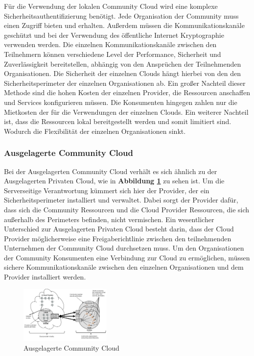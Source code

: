 Für die Verwendung der lokalen Community Cloud wird eine komplexe Sicherheitsauthentifizierung benötigt. Jede Organisation der Community muss einen Zugriff bieten und erhalten.
Außerdem müssen die Kommunikationskanäle geschützt und bei der Verwendung des öffentliche Internet Kryptographie verwenden werden. Die einzelnen Kommunikationskanäle zwischen den Teilnehmern 
können verschiedene Level der Performance, Sicherheit und Zuverlässigkeit bereitstellen, abhängig von den Ansprüchen der Teilnehmenden Organisationen. Die Sicherheit der einzelnen Clouds hängt 
hierbei von den den Sicherheitsperimeter der einzelnen Organisationen ab. Ein großer Nachteil dieser Methode sind die hohen Kosten der einzelnen Provider, die Ressourcen 
anschaffen und Services konfigurieren müssen. Die Konsumenten hingegen zahlen nur die Mietkosten der für die Verwendungen der einzelnen Clouds. Ein weiterer Nachteil ist, dass 
die Ressourcen lokal bereitgestellt werden und somit limitiert sind. Wodurch die Flexibilität der einzelnen Organisationen sinkt.


\subsubsection{Ausgelagerte Community Cloud}

Bei der Ausgelagerten Community Cloud verhält es sich ähnlich zu der Ausgelagerten Privaten Cloud, wie in \textbf{Abbildung \ref{OutSourcedCommunityCloud}} zu sehen ist.
Um die Serverseitige Verantwortung kümmert sich hier der Provider, der ein Sicherheitsperimeter installiert und verwaltet. Dabei sorgt der Provider dafür, dass sich 
die Community Ressourcen und die Cloud Provider Ressourcen, die sich außerhalb des Perimeters befinden, nicht vermischen. Ein wesentlicher Unterschied zur Ausgelagerten Privaten Cloud
besteht darin, dass der Cloud Provider möglicherweise eine Freigaberichtlinie zwischen den teilnehmenden Unternehmen der Community Cloud durchsetzen muss. 
Um den Organisationen der Community Konsumenten eine Verbindung zur Cloud zu ermöglichen, müssen sichere Kommunikationskanäle zwischen den einzelnen Organisationen und 
dem Provider installiert werden. 

\begin{figure}[H]
    \centering
	\includegraphics[width=0.4\textwidth]{Images/OutSourcedCommunityCloud}
	\caption{Ausgelagerte Community Cloud \cite{Badger}}
	\label{OutSourcedCommunityCloud}
\end{figure}



